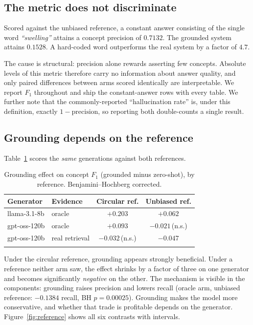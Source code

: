 \documentclass[pdflatex,sn-mathphys-num]{sn-jnl}
\theoremstyle{thmstyleone}
\theoremstyle{thmstyletwo}
\theoremstyle{thmstylethree}
\begin{document}
\subsection{The metric does not discriminate}\label{subsec:res-metric}

Scored against the unbiased reference, a constant answer consisting of the single word
\emph{``swelling''} attains a concept precision of $0.7132$. The grounded system attains
$0.1528$. A hard-coded word outperforms the real system by a factor of $4.7$.

The cause is structural: precision alone rewards asserting few concepts. Absolute levels
of this metric therefore carry no information about answer quality, and only paired
differences between arms scored identically are interpretable. We report $F_1$
throughout and ship the constant-answer rows with every table. We further note that the
commonly-reported ``hallucination rate'' is, under this definition, exactly
$1 - \mathrm{precision}$, so reporting both double-counts a single result.

\subsection{Grounding depends on the reference}\label{subsec:res-grounding}

Table~\ref{tab:grounding} scores the \emph{same} generations against both references.

\begin{table}[htbp]
\caption{Grounding effect on concept $F_1$ (grounded minus zero-shot), by reference.
Benjamini--Hochberg corrected.}\label{tab:grounding}
\begin{tabular}{@{}llcc@{}}
\toprule
Generator & Evidence & Circular ref. & Unbiased ref. \\
\midrule
llama-3.1-8b  & oracle          & $+0.203$ & $+0.062$ \\
gpt-oss-120b  & oracle          & $+0.093$ & $-0.021$\,(n.s.) \\
gpt-oss-120b  & real retrieval  & $-0.032$\,(n.s.) & $\mathbf{-0.047}$ \\
\botrule
\end{tabular}
\end{table}

Under the circular reference, grounding appears strongly beneficial. Under a reference
neither arm saw, the effect shrinks by a factor of three on one generator and becomes
significantly \emph{negative} on the other. The mechanism is visible in the components:
grounding raises precision and lowers recall (oracle arm, unbiased reference:
$-0.1384$ recall, BH $p = 0.00025$). Grounding makes the model more conservative, and
whether that trade is profitable depends on the generator.
Figure~\ref{fig:reference} shows all six contrasts with intervals.
\end{document}
